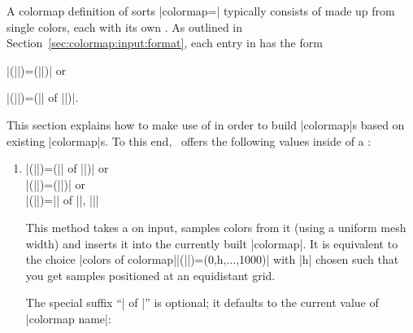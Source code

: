 {%
%
A colormap definition of sorts |colormap=| typically consists of  made up from single colors, each with its own . As outlined in Section~\ref{sec:colormap:input:format}, each entry in  has the form 

	|(||)=(||)| or

	|(||)=(|| of ||)|.

\noindent This section explains how to make use of  in order to build |colormap|s based on existing |colormap|s. To this end, \PGFPlots\ offers the following values inside of a :

\begin{enumerate}

	\item

	|(||)=(|| of ||)| or\\
	|(||)=(||)| or\\
	|(||)={|| of ||, ||}|

	This method takes a  on input, samples  colors from it (using a uniform mesh width) and inserts it into the currently built |colormap|. It is equivalent to the choice |colors of colormap||(||)=(0,h,...,1000)| with |h| chosen such that you get  samples positioned at an equidistant grid.

\begin{codeexample}[]
\pgfplotscolorbardrawstandalone[
	colormap={example}{%
		samples of colormap=(4 of viridis)
	},
	colorbar horizontal,
	colormap access=const]
\end{codeexample}
\begin{codeexample}[]
\pgfplotscolorbardrawstandalone[
	colormap={example}{%
		samples of colormap=(4 of viridis)
	},
	colorbar horizontal,
	colormap access=map]
\end{codeexample}

	The special suffix ``| of |'' is optional; it defaults to the current value of |colormap name|:
\begin{codeexample}[]
\pgfplotscolorbardrawstandalone[
	colormap={example}{%
		samples of colormap=(4)
	},
	colorbar horizontal,
	colormap access=const]
\end{codeexample}
\begin{codeexample}[]
\pgfplotscolorbardrawstandalone[
	colormap={example}{%
		samples of colormap=(4)
	},
	colorbar horizontal,
	colormap access=map]
\end{codeexample}


\end{enumerate}}
